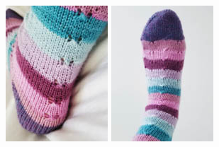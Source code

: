 \documentclass[12pt]{article}
\begin{document}
\begin{titlingpage}
\begin{multicols}{2}
\begin{center}
\vspace{1em}
\includegraphics[height=0.5\linewidth]{backleg-small.jpg} \hspace{1em}
\includegraphics[height=0.5\linewidth]{frontfoot-small.jpg}
\end{center}
\end{multicols}
\end{titlingpage}

\end{document}
